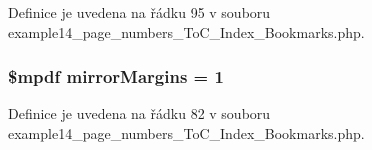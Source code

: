 Definice je uvedena na řádku 95 v souboru example14\-\_\-page\-\_\-numbers\-\_\-\-To\-C\-\_\-\-Index\-\_\-\-Bookmarks.\-php.

\hypertarget{example14__page__numbers___to_c___index___bookmarks_8php_a24c284cb7774410f65953584ea1fd9c1}{
\subsubsection[{mirror\-Margins}]{\setlength{\rightskip}{0pt plus 5cm}\$mpdf mirror\-Margins = 1}}\label{example14__page__numbers___to_c___index___bookmarks_8php_a24c284cb7774410f65953584ea1fd9c1}


Definice je uvedena na řádku 82 v souboru example14\-\_\-page\-\_\-numbers\-\_\-\-To\-C\-\_\-\-Index\-\_\-\-Bookmarks.\-php.


